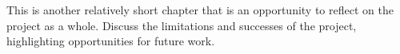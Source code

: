This is another relatively short chapter that is an opportunity to reflect on the project as a whole. Discuss the limitations and successes of the project, highlighting opportunities for future work. 
